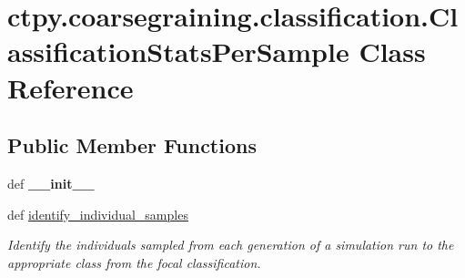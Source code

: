 \hypertarget{classctpy_1_1coarsegraining_1_1classification_1_1_classification_stats_per_sample}{\section{ctpy.\-coarsegraining.\-classification.\-Classification\-Stats\-Per\-Sample Class Reference}
\label{classctpy_1_1coarsegraining_1_1classification_1_1_classification_stats_per_sample}
}
\subsection*{Public Member Functions}
\begin{DoxyCompactItemize}
\item 
\hypertarget{classctpy_1_1coarsegraining_1_1classification_1_1_classification_stats_per_sample_a3dc6686da12386c7ca84d767e2d74397}{def {\bfseries \-\_\-\-\_\-init\-\_\-\-\_\-}}\label{classctpy_1_1coarsegraining_1_1classification_1_1_classification_stats_per_sample_a3dc6686da12386c7ca84d767e2d74397}

\item 
def \hyperlink{classctpy_1_1coarsegraining_1_1classification_1_1_classification_stats_per_sample_a8873877c1648b605c1c53d159beb775b}{identify\-\_\-individual\-\_\-samples}
\begin{DoxyCompactList}\small\item\em Identify the individuals sampled from each generation of a simulation run to the appropriate class from the focal classification. \end{DoxyCompactList}\end{DoxyCompactItemize}
